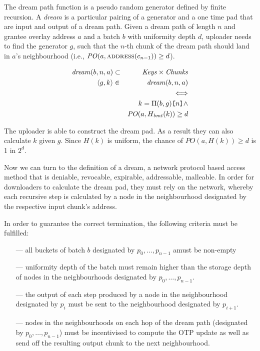 The dream path function is a pseudo random generator defined by finite recursion. A \emph{dream} is a particular pairing of a generator and a one time pad that are input and output of a dream path.
Given a dream path of length $n$ and grantee overlay address $a$ and a batch $b$ with uniformity depth $d$, uploader needs to find the generator $g$, such that the $n$-th chunk of the dream path should land in $a$'s neighbourhood (i.e., $\mathit{PO}(a,\textsc{address}(c_{n-1}))\geq d$).

\begin{eqnarray}
\mathit{dream}(b,n,a) &\subset &\mathit{Keys}\times\mathit{Chunks}\\
\langle g, k\rangle &\in& \mathit{dream}(b,n,a) \\
&&\Longleftrightarrow\\
&&k=\Pi(b,g)\texttt{[}\/n\/\texttt{]}
\land\\
&&\mathit{PO}(a,H_{\mathit{bmt}}(k))\geq d
\end{eqnarray}

The uploader is able to construct the dream pad.
As a result they can also calculate $k$ given $g$. Since $\mathit{H}(k)$ is uniform, the chance of $\mathit{PO}(a,\mathit{H}(k))\geq d$ is 1 in $2^{d}$. 



Now we can turn to the definition of a dream, a network protocol based access method that is deniable, revocable, expirable, addressable, malleable. In order for downloaders to calculate the dream pad, they must rely on the network, whereby each recursive step is calculated by a node in the neighbourhood designated by the respective input chunk's address. 

In order to guarantee the correct termination, the following criteria must be fulfilled:
\begin{itemize}[noitemsep]
\item[---] all  buckets of batch $b$ designated by $p_0,\ldots, p_{n-1}$ amust be non-empty
\item[---] uniformity depth of the batch must remain higher than the storage depth of nodes in the neighbourhoods designated by $p_0, \ldots , p_{n-1}$.
\item[---] the output of each step produced by a node in the neighbourhood designated by $p_i$ must be sent to the 
neighbourhood designated by $p_{i+1}$. 
\item[---]  nodes in the neighbourhoods on each hop of the dream path (designated by $p_0,\ldots, p_{n-1}$) must be 
incentivised to compute the OTP update as well as send off the resulting output chunk to the next neighbourhood. \end{itemize}


